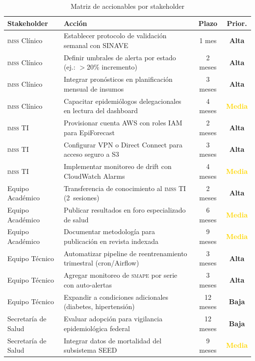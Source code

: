 \documentclass[12pt, letterpaper]{article}
\newcommand{\smape}{\textnormal{\textsc{smape}}}
\newcommand{\imss}{\textnormal{\textsc{imss}}}
\newcommand{\riskHigh}{\cellcolor{lightred}\textbf{\textcolor{burgundy}{Alta}}}
\newcommand{\riskMed}{\cellcolor{lightyellow}\textbf{\textcolor{gold}{Media}}}
\newcommand{\riskLow}{\cellcolor{lightgreen}\textbf{\textcolor{darkteal}{Baja}}}
\begin{document}
\begin{table}[H]
\centering
\caption{Matriz de accionables por stakeholder}
\label{tab:accionables}
\scriptsize
\setlength{\tabcolsep}{3pt}
\begin{tabularx}{\textwidth}{l X c c}
\toprule
\textbf{Stakeholder} & \textbf{Acción} & \textbf{Plazo} & \textbf{Prior.} \\
\midrule
\imss{} Clínico & Establecer protocolo de validación semanal con SINAVE & 1 mes & \riskHigh \\
\imss{} Clínico & Definir umbrales de alerta por estado (ej.: $>$20\% incremento) & 2 meses & \riskHigh \\
\imss{} Clínico & Integrar pronósticos en planificación mensual de insumos & 3 meses & \riskHigh \\
\imss{} Clínico & Capacitar epidemiólogos delegacionales en lectura del dashboard & 4 meses & \riskMed \\
\addlinespace
\imss{} TI & Provisionar cuenta AWS con roles IAM para EpiForecast & 2 meses & \riskHigh \\
\imss{} TI & Configurar VPN o Direct Connect para acceso seguro a S3 & 3 meses & \riskHigh \\
\imss{} TI & Implementar monitoreo de drift con CloudWatch Alarms & 4 meses & \riskMed \\
\addlinespace
Equipo Académico & Transferencia de conocimiento al \imss{} TI (2~sesiones) & 2 meses & \riskHigh \\
Equipo Académico & Publicar resultados en foro especializado de salud & 6 meses & \riskMed \\
Equipo Académico & Documentar metodología para publicación en revista indexada & 9 meses & \riskMed \\
\addlinespace
Equipo Técnico & Automatizar pipeline de reentrenamiento trimestral (cron/Airflow) & 3 meses & \riskHigh \\
Equipo Técnico & Agregar monitoreo de \smape{} por serie con auto-alertas & 3 meses & \riskHigh \\
Equipo Técnico & Expandir a condiciones adicionales (diabetes, hipertensión) & 12 meses & \riskLow \\
\addlinespace
Secretaría de Salud & Evaluar adopción para vigilancia epidemiológica federal & 12 meses & \riskLow \\
Secretaría de Salud & Integrar datos de mortalidad del subsistema SEED & 9 meses & \riskMed \\
\bottomrule
\end{tabularx}
\end{table}
\end{document}
